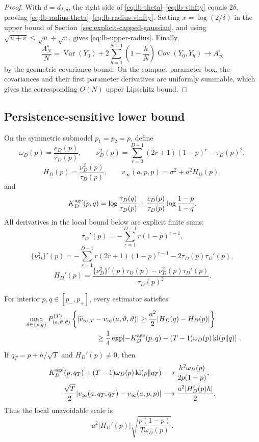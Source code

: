 \begin{proof}
With \(d=d_{T,\delta}\), the right side of
\eqref{eq:lb-theta}--\eqref{eq:lb-vinfty} equals \(2\delta\), proving
\eqref{eq:lb-radius-theta}--\eqref{eq:lb-radius-vinfty}.  Setting
\(x=\log(2/\delta)\) in the upper bound of
Section~\ref{sec:explicit-capped-gaussian}, and using
\(\sqrt{u+v}\leq\sqrt u+\sqrt v\), gives
\eqref{eq:lb-upper-radius}.  Finally,
\[
 \frac{A_N^\circ}{N}
 =\operatorname{Var}(Y_0)
 +2\sum_{h=1}^{N-1}
 \left(1-\frac hN\right)\operatorname{Cov}(Y_0,Y_h)
 \longrightarrow A_\infty^\circ
\]
by the geometric covariance bound.  On the compact parameter box, the
covariances and their first parameter derivatives are uniformly summable,
which gives the corresponding \(O(N)\) upper Lipschitz bound.
\end{proof}

\subsection{Persistence-sensitive lower bound}

On the symmetric submodel \(p_1=p_2=p\), define
\[
 \omega_D(p)=\frac{e_D(p)}{\tau_D(p)},\qquad
 \nu_D^2(p)=
 \sum_{r=0}^{D-1}(2r+1)(1-p)^r-\tau_D(p)^2,
\]
\[
 H_D(p)=\frac{\nu_D^2(p)}{\tau_D(p)},\qquad
 v_\infty(a,p,p)=\sigma^2+a^2H_D(p),
\]
and
\[
 K_D^{\rm age}(p,q)
 =
 \log\frac{\tau_D(q)}{\tau_D(p)}
 +\frac{c_D(p)}{\tau_D(p)}
 \log\frac{1-p}{1-q}.
\]
All derivatives in the local bound below are explicit finite sums:
\[
 \tau_D'(p)=-\sum_{r=1}^{D-1}r(1-p)^{r-1},
\]
\[
 \{\nu_D^2\}'(p)
 =-\sum_{r=1}^{D-1}r(2r+1)(1-p)^{r-1}
 -2\tau_D(p)\tau_D'(p),
\]
\[
 H_D'(p)
 =\frac{\{\nu_D^2\}'(p)\tau_D(p)
 -\nu_D^2(p)\tau_D'(p)}{\tau_D(p)^2}.
\]

\begin{proposition}
\label{prop:lb-persistence}
For interior \(p,q\in[p_-,p_+]\), every estimator satisfies
\begin{align}
 &\max_{\vartheta\in\{p,q\}}
 P_{(a,\vartheta,\vartheta)}^{(T)}
 \left\{
 \left|\widehat v_{\infty,T}
 -v_\infty(a,\vartheta,\vartheta)\right|
 \geq
 \frac{a^2}{2}|H_D(q)-H_D(p)|
 \right\}
 \nonumber\\
 &\hspace{35mm}\geq
 \frac14\exp\!\left[
 -K_D^{\rm age}(p,q)
 -(T-1)\omega_D(p)\operatorname{kl}(p\|q)
 \right].
 \label{eq:lb-persistence-finite}
\end{align}
If \(q_T=p+h/\sqrt T\) and \(H_D'(p)\neq0\), then
\begin{align}
 K_D^{\rm age}(p,q_T)
 +(T-1)\omega_D(p)\operatorname{kl}(p\|q_T)
 &\longrightarrow
 \frac{h^2\omega_D(p)}{2p(1-p)},
 \label{eq:lb-persistence-kl-limit}\\
 \frac{\sqrt T}{2}
 |v_\infty(a,q_T,q_T)-v_\infty(a,p,p)|
 &\longrightarrow
 \frac{a^2|H_D'(p)h|}{2}.
 \label{eq:lb-persistence-target-limit}
\end{align}
Thus the local unavoidable scale is
\begin{equation}
 a^2|H_D'(p)|
 \sqrt{\frac{p(1-p)}{T\omega_D(p)}}.
 \label{eq:lb-persistence-scale}
\end{equation}
\end{proposition}

